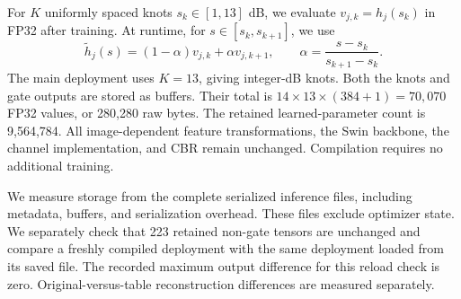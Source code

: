 For $K$ uniformly spaced knots $s_k\in[1,13]$ dB, we evaluate $v_{j,k}=h_j(s_k)$ in FP32 after training. At runtime, for $s\in[s_k,s_{k+1}]$, we use
\begin{equation}
 \widetilde h_j(s)=(1-\alpha)v_{j,k}+\alpha v_{j,k+1},\qquad
 \alpha=\frac{s-s_k}{s_{k+1}-s_k}.
\end{equation}
The main deployment uses $K=13$, giving integer-dB knots. Both the knots and gate outputs are stored as buffers. Their total is $14\times13\times(384+1)=70{,}070$ FP32 values, or 280,280 raw bytes. The retained learned-parameter count is 9,564,784. All image-dependent feature transformations, the Swin backbone, the channel implementation, and CBR remain unchanged. Compilation requires no additional training.

We measure storage from the complete serialized inference files, including metadata, buffers, and serialization overhead. These files exclude optimizer state. We separately check that 223 retained non-gate tensors are unchanged and compare a freshly compiled deployment with the same deployment loaded from its saved file. The recorded maximum output difference for this reload check is zero. Original-versus-table reconstruction differences are measured separately.

\begin{table}[t]
 \centering\small
 
 \caption{Current checkpoint (21,500 updates): complete inference-file sizes and learned-parameter counts. Table buffers are additional stored values, rather than learned parameters.}
 \label{tab:storage}
\end{table}
